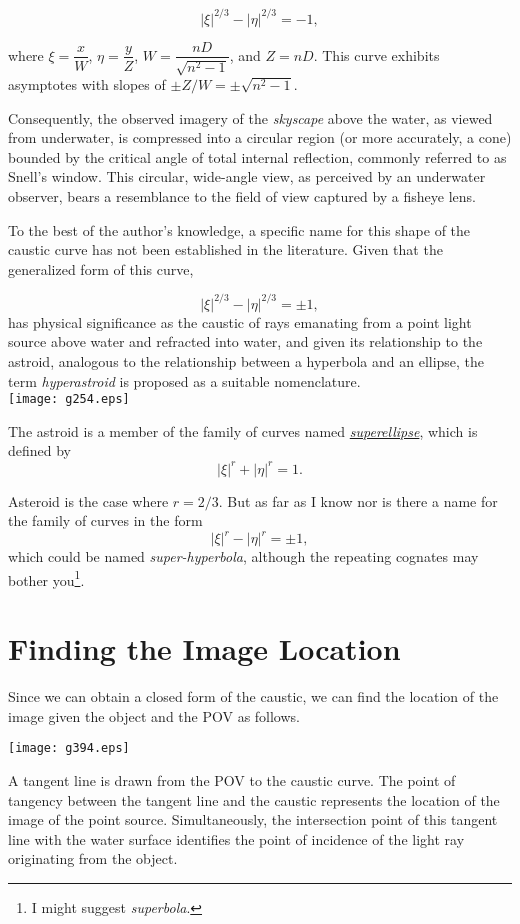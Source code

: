 \documentclass[twocolumn]{article}
\begin{document}
$$ \left| \xi \right|^{2/3} - \left| \eta \right|^{2/3} = -1, $$

where $\xi = \dfrac{x}{W} $, $\eta = \dfrac{y}{Z}$, 
$W = \dfrac{nD}{\sqrt{n^2-1}}$, and $Z = nD$. This curve exhibits asymptotes 
with slopes of $\pm Z/W = \pm \sqrt{n^2-1}$. 

Consequently, the observed imagery of the \emph{skyscape} above the water, 
as viewed from underwater, is compressed into a circular region (or more 
accurately, a cone) bounded by the critical angle of total internal reflection, 
commonly referred to as Snell's window. This circular, wide-angle view, as 
perceived by an underwater observer, bears a resemblance to the field of view 
captured by a fisheye lens.

To the best of the author's knowledge, a specific name for this shape of the 
caustic curve has not been established in the literature. Given that the 
generalized form of this curve, 

$$ \left| \xi \right|^{2/3} - \left| \eta \right|^{2/3} = \pm1, $$
has physical significance as the caustic of rays emanating from a point light 
source above water and refracted into water, and given its relationship to 
the astroid, analogous to the relationship between a hyperbola and an ellipse, 
the term \emph{hyperastroid} is proposed as a suitable nomenclature.\\

\texttt{[image: g254.eps]}

The astroid is a member of the 
family of curves named \href{https://mathworld.wolfram.com/Astroid.html}{\emph{superellipse}}, which is defined by 
$$ \left| \xi \right|^{r} + \left| \eta \right|^{r} = 1. $$

Asteroid is the case where $r=2/3$. But as far as I know nor is there a name for the 
family of curves in the form
$$ \left| \xi \right|^{r} - \left| \eta \right|^{r} = \pm 1, $$
which could be named \emph{super-hyperbola}, although the repeating cognates may 
bother you\footnote{I might suggest \emph{superbola}.}.

\section{Finding the Image Location}
Since we can obtain a closed form of the caustic, we can find the location of the 
image given the object and the POV as follows.

\texttt{[image: g394.eps]}

A tangent line is drawn from the POV to the caustic curve. The point of tangency 
between the tangent line and the caustic represents the location of the image of 
the point source. Simultaneously, the intersection point of this tangent line 
with the water surface identifies the point of incidence of the light ray 
originating from the object.
\end{document}
